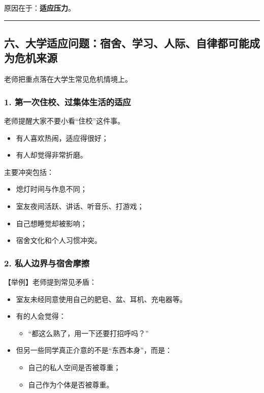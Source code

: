 \documentclass[
  chinese,
  9pt,
  a4paper,
]{ctexart}
\providecommand{\tightlist}{%
  \setlength{\itemsep}{0pt}\setlength{\parskip}{0pt}}
\begin{document}
原因在于：\textbf{适应压力}。

\begin{center}\rule{0.5\linewidth}{0.5pt}\end{center}

\subsection{六、大学适应问题：宿舍、学习、人际、自律都可能成为危机来源}\label{ux516dux5927ux5b66ux9002ux5e94ux95eeux9898ux5bbfux820dux5b66ux4e60ux4ebaux9645ux81eaux5f8bux90fdux53efux80fdux6210ux4e3aux5371ux673aux6765ux6e90}

老师把重点落在大学生常见危机情境上。

\subsubsection{1.
第一次住校、过集体生活的适应}\label{ux7b2cux4e00ux6b21ux4f4fux6821ux8fc7ux96c6ux4f53ux751fux6d3bux7684ux9002ux5e94}

老师提醒大家不要小看``住校''这件事。

\begin{itemize}
\tightlist
\item
  有人喜欢热闹，适应得很好；
\item
  有人却觉得非常折磨。
\end{itemize}

主要冲突包括：

\begin{itemize}
\tightlist
\item
  熄灯时间与作息不同；
\item
  室友夜间活跃、讲话、听音乐、打游戏；
\item
  自己想睡觉却被影响；
\item
  宿舍文化和个人习惯冲突。
\end{itemize}

\subsubsection{2.
私人边界与宿舍摩擦}\label{ux79c1ux4ebaux8fb9ux754cux4e0eux5bbfux820dux6469ux64e6}

【举例】老师提到常见矛盾：

\begin{itemize}
\item
  室友未经同意使用自己的肥皂、盆、耳机、充电器等。
\item
  有的人会觉得：

  \begin{itemize}
  \tightlist
  \item
    ``都这么熟了，用一下还要打招呼吗？''
  \end{itemize}
\item
  但另一些同学真正介意的不是``东西本身''，而是：

  \begin{itemize}
  \tightlist
  \item
    自己的私人空间是否被尊重；
  \item
    自己作为个体是否被尊重。
  \end{itemize}
\end{itemize}
\end{document}
